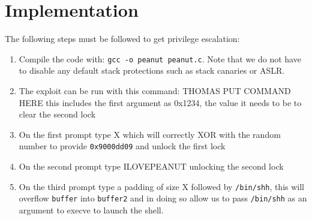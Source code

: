 \section{Implementation}
\label{sec:implementation}
The following steps must be followed to get privilege escalation:
\begin{enumerate}
\item Compile the code with:  {\tt gcc -o peanut peanut.c}. Note that we do not have to disable any default stack protections such as stack canaries or ASLR. 
\item The exploit can be run with this command: THOMAS PUT COMMAND HERE this includes the first argument as 0x1234, the value it needs to be to clear the second lock
\item On the first prompt type X which will correctly XOR with the random number to provide {\tt0x9000dd09} and unlock the first lock
\item On the second prompt type ILOVEPEANUT unlocking the second lock
\item On the third prompt type a padding of size X followed by {\tt /bin/shh}, this will overflow {\tt buffer} into {\tt buffer2} and in doing so allow us to pass {\tt /bin/shh} as an argument to execve to launch the shell.
\end{enumerate}


